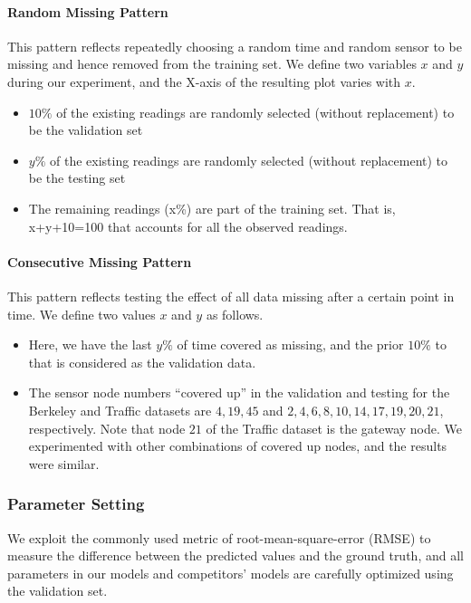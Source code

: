 \paragraph*{Random Missing Pattern}
This pattern reflects repeatedly choosing a random time and random sensor to be missing and hence removed from the training set.
%
We define two variables $x$ and $y$ during our experiment, and the X-axis of the resulting plot varies with $x$.
\begin{itemize}
\item $10\%$ of the existing readings are randomly selected (without replacement) to be the validation set
\item $y\%$ of the existing readings are randomly selected (without replacement) to be the testing set
\item The remaining readings (x\%) are part of the training set. That is, x+y+10=100 that accounts for all the observed readings.
\end{itemize}

\paragraph*{Consecutive Missing Pattern}
This pattern reflects testing the effect of all data missing after a certain point in time.
We define two values $x$ and $y$ as follows.
\begin{itemize}
\item Here, we have the last $y\%$ of time covered as missing, and the prior $10\%$ to that is considered as the validation data.
\item The sensor node numbers ``covered up'' in the validation and testing for the Berkeley and Traffic datasets are ${4,19,45}$ and ${2,4,6,8,10,14,17,19,20,21}$, respectively.
Note that node $21$ of the Traffic dataset is the gateway node.
We experimented with other combinations of covered up nodes, and the results were similar.
\end{itemize}

\subsubsection{Parameter Setting}

We exploit the commonly used metric of root-mean-square-error (RMSE)
to measure the difference between the predicted values and the ground
truth, and all parameters in our models and competitors' models are
carefully optimized using the validation set.


